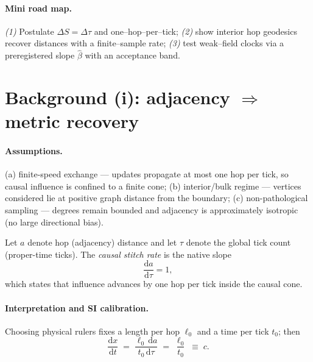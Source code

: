 \paragraph{Mini road map.} \emph{(1)} Postulate $\Delta S=\Delta\tau$ and one--hop--per--tick; \emph{(2)} show interior hop geodesics recover distances with a finite--sample rate; \emph{(3)} test weak--field clocks via a preregistered slope $\hat\beta$ with an acceptance band.


\section*{Background (i): adjacency \texorpdfstring{$\Rightarrow$}{⇒} metric recovery}
\paragraph{Assumptions.}
(a) finite-speed exchange — updates propagate at most one hop per tick, so causal influence is confined to a finite cone;
(b) interior/bulk regime — vertices considered lie at positive graph distance from the boundary;
(c) non-pathological sampling — degrees remain bounded and adjacency is approximately isotropic (no large directional bias).


\begin{definition}\label{def:stitch}
Let $a$ denote hop (adjacency) distance and let $\tau$ denote the global tick count (proper-time ticks).
The \emph{causal stitch rate} is the native slope
\begin{equation}
\frac{\mathrm{d}a}{\mathrm{d}\tau}=1,
\end{equation}
which states that influence advances by one hop per tick inside the causal cone.
\end{definition}

\paragraph{Interpretation and SI calibration.}
Choosing physical rulers fixes a length per hop $\ell_0$ and a time per tick $t_0$; then
\begin{equation}
\frac{\mathrm{d}x}{\mathrm{d}t} \;=\; \frac{\ell_0\,\mathrm{d}a}{t_0\,\mathrm{d}\tau} \;=\; \frac{\ell_0}{t_0} \;\equiv\; c.
\end{equation}





